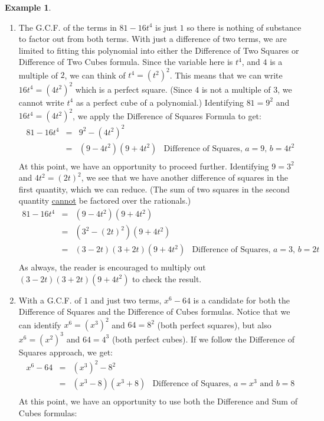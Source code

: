 \documentclass[11pt]{article}
\theoremstyle{definition}  %
\newtheorem{ex}{\bf Example}
\begin{document}
\begin{ex}
\begin{enumerate}
\item  The G.C.F. of the terms in $81 - 16t^4$ is just $1$ so there is nothing of substance to factor out from both terms.  With just a difference of two terms, we are limited to fitting this polynomial into either the Difference of Two Squares or Difference of Two Cubes formula. Since the variable here is $t^4$, and $4$ is a multiple of $2$, we can think of $t^4 = (t^2)^2$.  This means that we can write $16t^4 = (4t^2)^2$ which is a perfect square.  (Since $4$ is not a multiple of $3$, we cannot write $t^4$ as a perfect cube of a polynomial.)  Identifying $81 = 9^2$ and $16t^4 = (4t^2)^2$, we apply the Difference of Squares Formula to get: \[ \begin{array}{rclr}

81 - 16t^4 & = & 9^2 - (4t^2)^2 & \\
           & = & (9-4t^2)(9+4t^2) & \text{Difference of Squares, $a = 9$, $b = 4t^2$} \\ \end{array}\] At this point, we have an opportunity to proceed further.  Identifying $9 = 3^2$ and $4t^2 = (2t)^2$, we see that we have another difference of squares in the first quantity, which we can reduce. (The sum of two squares in the second quantity \underline{cannot} be factored over the rationals.) \[ \begin{array}{rclr}
81 - 16t^4 & = & (9-4t^2)(9+4t^2) & \\
           & = & (3^2 - (2t)^2) (9 + 4t^2) & \\
					 & = & (3 - 2t)(3+2t)(9 + 4t^2) & \text{Difference of Squares, $a = 3$, $b = 2t$} \\ \end{array} \] As always, the reader is encouraged to multiply out $(3 - 2t)(3+2t)(9 + 4t^2)$ to check the result.

\item  With a G.C.F. of $1$ and just two terms, $x^6 - 64$ is a candidate for both the Difference of Squares and the Difference of Cubes formulas.  Notice that we can identify $x^6 = (x^3)^2$ and $64 = 8^2$ (both perfect squares), but also $x^6 = (x^2)^3$ and $64 = 4^3$ (both perfect cubes).  If we follow the Difference of Squares approach, we get: \[ \begin{array}{rclr}

x^6 - 64 & = & (x^3)^2 - 8^2 & \\
         & = & (x^3 - 8)(x^3 + 8) & \text{Difference of Squares, $a = x^3$ and $b = 8$} \\ \end{array} \] At this point, we have an opportunity to use both the Difference and Sum of Cubes formulas: \[ \begin{array}{rclr}


\end{array}\]
\end{enumerate}
\end{ex}
\end{document}
